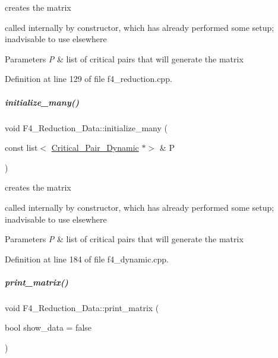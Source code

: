 creates the matrix 

called internally by constructor, which has already performed some setup; inadvisable to use elsewhere 
\begin{DoxyParams}{Parameters}
{\em P} & list of critical pairs that will generate the matrix \\
\hline
\end{DoxyParams}


Definition at line 129 of file f4\+\_\+reduction.\+cpp.

\mbox{\label{group___g_b_computation_a9fa6a212375b9498ca86a2c18e94ca1e}} 
\subparagraph{\texorpdfstring{initialize\+\_\+many()}{initialize\_many()}\hspace{0.1cm}{\footnotesize\ttfamily [2/2]}}
{\footnotesize\ttfamily void F4\+\_\+\+Reduction\+\_\+\+Data\+::initialize\+\_\+many (\begin{DoxyParamCaption}\item[{const list$<$ \hyperlink{group___g_b_computation_class_critical___pair___dynamic}{Critical\+\_\+\+Pair\+\_\+\+Dynamic} $\ast$$>$ \&}]{P }\end{DoxyParamCaption})}



creates the matrix 

called internally by constructor, which has already performed some setup; inadvisable to use elsewhere 
\begin{DoxyParams}{Parameters}
{\em P} & list of critical pairs that will generate the matrix \\
\hline
\end{DoxyParams}


Definition at line 184 of file f4\+\_\+dynamic.\+cpp.

\mbox{\label{group___g_b_computation_a9f3e9b5617084c34f97acd23d6e67a43}} 
\subparagraph{\texorpdfstring{print\+\_\+matrix()}{print\_matrix()}\hspace{0.1cm}{\footnotesize\ttfamily [1/2]}}
{\footnotesize\ttfamily void F4\+\_\+\+Reduction\+\_\+\+Data\+::print\+\_\+matrix (\begin{DoxyParamCaption}\item[{bool}]{show\+\_\+data = {\ttfamily false} }\end{DoxyParamCaption})}



